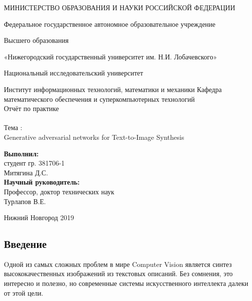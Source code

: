 \documentclass{article}
\begin{document}
    \begin{center} 
    \large МИНИСТЕРСТВО ОБРАЗОВАНИЯ И НАУКИ РОССИЙСКОЙ ФЕДЕРАЦИИ

Федеральное государственное автономное образовательное учреждение

Высшего образования

«Нижегородский государственный университет им. Н.И. Лобачевского»

Национальный исследовательский университет

Институт информационных технологий, математики и механики 
Кафедра математического обеспечения и суперкомпьютерных технологий\\[3.5cm] 
    
    \huge Отчёт по практике \\[0.6cm] %
    \\ 
    \huge{Тема :}\\[0.6cm]
    \huge Generative adversarial networks for Text-to-Image Synthesis\\[7.7cm]
    
    
    \end{center} 
    
    \begin{flushright}
    \large \textbf{Выполнил:} \\
    студент гр. 381706-1 \\
    Митягина Д.С. \\
    \textbf{Научный руководитель:} \\
    Профессор, доктор технических наук\\
    Турлапов В.Е. \\
    [3.7cm]
    \end{flushright}
    
    
    
    \begin{center} 
    \large Нижний Новгород 2019
    \end{center} 
    
    \thispagestyle{empty}
    \newpage
      \begin{center}
        \tableofcontents
      \end{center}
    \newpage
    \begin{center} 
    \section{Введение}
    \end{center} 
      \large Oдной из самых сложных проблем в мире Computer Vision является синтез высококачественных изображений из текстовых описаний. Без сомнения, это интересно и полезно, но современные системы искусственного интеллекта далеки от этой цели.
\end{document}
